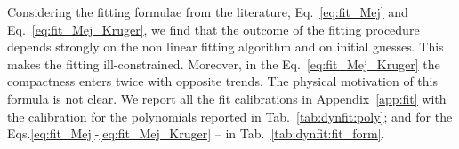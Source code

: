 %
Considering the fitting formulae from the literature, Eq.~\eqref{eq:fit_Mej} and 
Eq.~\eqref{eq:fit_Mej_Kruger}, we find that the outcome of the fitting procedure depends 
strongly on the non linear fitting algorithm and on initial guesses. This makes the 
fitting ill-constrained. Moreover, in the Eq.~\eqref{eq:fit_Mej_Kruger} the compactness 
enters twice with opposite trends. The physical motivation of this formula is not clear.
%
We report all the fit calibrations in Appendix~\ref{app:fit}
with the calibration for the polynomials reported in Tab.~\ref{tab:dynfit:poly};
and for the Eqs.\eqref{eq:fit_Mej}-\eqref{eq:fit_Mej_Kruger} -- 
in Tab.~\ref{tab:dynfit:fit_form}.

 

